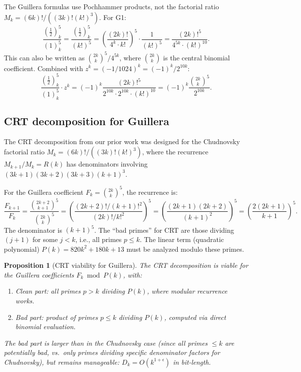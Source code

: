 \documentclass[11pt]{article}
\newtheorem{proposition}[theorem]{Proposition}
\begin{document}
The Guillera formulas use Pochhammer products, not the factorial ratio $M_k = (6k)!/((3k)!(k!)^3)$. For G1:
\[
\frac{(\tfrac{1}{2})_k^5}{(1)_k^5} = \frac{(\tfrac{1}{2})_k^5}{(k!)^5} = \left(\frac{(2k)!}{4^k \cdot k!}\right)^5 \cdot \frac{1}{(k!)^5} = \frac{(2k)!^5}{4^{5k} \cdot (k!)^{10}}.
\]
This can also be written as $\binom{2k}{k}^5 / 4^{5k}$, where $\binom{2k}{k}$ is the central binomial coefficient. Combined with $z^k = (-1/1024)^k = (-1)^k / 2^{10k}$:
\[
\frac{(\tfrac{1}{2})_k^5}{(1)_k^5} \cdot z^k = (-1)^k \frac{(2k)!^5}{2^{10k} \cdot 2^{10k} \cdot (k!)^{10}} = (-1)^k \frac{\binom{2k}{k}^5}{2^{10k}}.
\]

\subsection{CRT decomposition for Guillera}

The CRT decomposition from our prior work was designed for the Chudnovsky factorial ratio $M_k = (6k)!/((3k)!(k!)^3)$, where the recurrence $M_{k+1}/M_k = R(k)$ has denominators involving $(3k+1)(3k+2)(3k+3)(k+1)^3$.

For the Guillera coefficient $F_k = \binom{2k}{k}^5$, the recurrence is:
\[
\frac{F_{k+1}}{F_k} = \frac{\binom{2k+2}{k+1}^5}{\binom{2k}{k}^5} = \left(\frac{(2k+2)!/(k+1)!^2}{(2k)!/k!^2}\right)^5 = \left(\frac{(2k+1)(2k+2)}{(k+1)^2}\right)^5 = \left(\frac{2(2k+1)}{k+1}\right)^5.
\]
The denominator is $(k+1)^5$. The ``bad primes'' for CRT are those dividing $(j+1)$ for some $j < k$, i.e., all primes $p \leq k$. The linear term (quadratic polynomial) $P(k) = 820k^2 + 180k + 13$ must be analyzed modulo these primes.

\begin{proposition}[CRT viability for Guillera]
The CRT decomposition is viable for the Guillera coefficients $F_k \bmod P(k)$, with:
\begin{enumerate}
\item Clean part: all primes $p > k$ dividing $P(k)$, where modular recurrence works.
\item Bad part: product of primes $p \leq k$ dividing $P(k)$, computed via direct binomial evaluation.
\end{enumerate}
The bad part is larger than in the Chudnovsky case (since all primes $\leq k$ are potentially bad, vs.\ only primes dividing specific denominator factors for Chudnovsky), but remains manageable: $D_k = O(k^{1+\epsilon})$ in bit-length.
\end{proposition}
\end{document}
